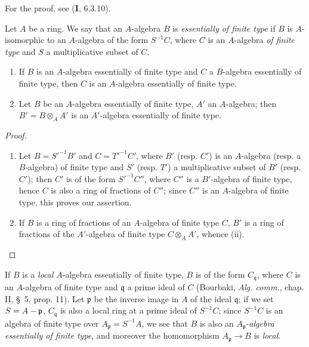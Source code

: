 For the proof, see (\textbf{I}, 6.3.10).

\begin{env}[1.3.8]
\label{IV.1.3.8}
Let $A$ be a ring. We say that an $A$-algebra $B$ is \emph{essentially of
finite type} if $B$ is $A$-isomorphic to an $A$-algebra of the form $S^{-1}C$,
where $C$ is an $A$-algebra \emph{of finite type} and $S$ a multiplicative
subset of $C$.
\end{env}

\par\medskip\noindent
\begin{proposition}[1.3.9]
\label{IV.1.3.9}
\begin{enumerate}
  \item[\textup{(i)}] If $B$ is an $A$-algebra essentially of finite type and $C$
  a $B$-algebra essentially of finite type, then $C$ is an
  $A$-algebra essentially of finite type.
  \item[\textup{(ii)}] Let $B$ be an $A$-algebra essentially of finite type, $A'$
  an $A$-algebra; then $B'=B\otimes_AA'$ is an $A'$-algebra
  essentially of finite type.
\end{enumerate}
\end{proposition}

\begin{proof}
\begin{enumerate}
  \item[(i)] Let $B=S'^{-1}B'$ and $C=T'^{-1}C'$, where $B'$ (resp. $C'$) is
  an $A$-algebra (resp. a $B$-algebra) of finite type and $S'$ (resp. $T'$)
  a multiplicative subset of $B'$ (resp. $C'$); then $C'$ is of the form
  $S'^{-1}C''$, where $C''$ is a $B'$-algebra of finite type, hence $C$ is
  also a ring of fractions of $C''$; since $C''$ is an $A$-algebra of finite
  type, this proves our assertion.
  \item[(ii)] If $B$ is a ring of fractions of an $A$-algebra of finite type
  $C$, $B'$ is a ring of fractions of the $A'$-algebra of finite type
  $C\otimes_AA'$, whence (ii).
\end{enumerate}
\end{proof}


\begin{env}[1.3.10]
\label{IV.1.3.10}
If $B$ is a \emph{local} $A$-algebra essentially of finite type, $B$ is
of the form $C_{\mathfrak q}$, where $C$ is an $A$-algebra of finite type and
$\mathfrak q$ a prime ideal of $C$ (Bourbaki, \emph{Alg. comm.}, chap. II,
\S~5, prop. 11). Let $\mathfrak p$ be the inverse image in $A$ of the ideal
$\mathfrak q$; if we set $S=A-\mathfrak p$, $C_{\mathfrak q}$ is also a
local ring at a prime ideal of $S^{-1}C$; since $S^{-1}C$ is an
algebra of finite type over $A_{\mathfrak p}=S^{-1}A$, we see that $B$ is also
an $A_{\mathfrak p}$-\emph{algebra essentially of finite type}, and moreover
the homomorphism $A_{\mathfrak p}\to B$ is \emph{local}.
\end{env}

